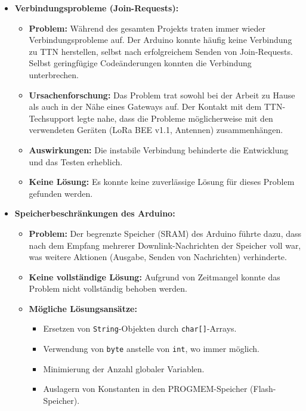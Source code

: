 \documentclass[12pt,a4paper]{article}
\begin{document}
\begin{itemize}
    \item \textbf{Verbindungsprobleme (Join-Requests):}
    \begin{itemize}
        \item \textbf{Problem:} Während des gesamten Projekts traten immer wieder Verbindungsprobleme auf. Der Arduino konnte häufig keine Verbindung zu TTN herstellen, selbst nach erfolgreichem Senden von Join-Requests. Selbst geringfügige Codeänderungen konnten die Verbindung unterbrechen.
        \item \textbf{Ursachenforschung:} Das Problem trat sowohl bei der Arbeit zu Hause als auch in der Nähe eines Gateways auf. Der Kontakt mit dem TTN-Techsupport legte nahe, dass die Probleme möglicherweise mit den verwendeten Geräten (LoRa BEE v1.1, Antennen) zusammenhängen.
        \item \textbf{Auswirkungen:} Die instabile Verbindung behinderte die Entwicklung und das Testen erheblich.
        \item \textbf{Keine Lösung:} Es konnte keine zuverlässige Lösung für dieses Problem gefunden werden.
    \end{itemize}
    \item \textbf{Speicherbeschränkungen des Arduino:}
    \begin{itemize}
        \item \textbf{Problem:} Der begrenzte Speicher (SRAM) des Arduino führte dazu, dass nach dem Empfang mehrerer Downlink-Nachrichten der Speicher voll war, was weitere Aktionen (Ausgabe, Senden von Nachrichten) verhinderte.
        \item \textbf{Keine vollständige Lösung:} Aufgrund von Zeitmangel konnte das Problem nicht vollständig behoben werden.
        \item \textbf{Mögliche Lösungsansätze:}
        \begin{itemize}
            \item Ersetzen von \texttt{String}-Objekten durch \texttt{char[]}-Arrays.
            \item Verwendung von \texttt{byte} anstelle von \texttt{int}, wo immer möglich.
            \item Minimierung der Anzahl globaler Variablen.
            \item Auslagern von Konstanten in den PROGMEM-Speicher (Flash-Speicher).
        \end{itemize}
    \end{itemize}
\end{itemize}
\end{document}
